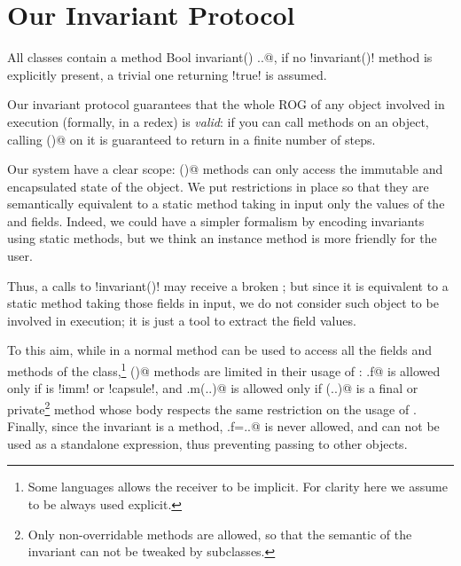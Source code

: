 \section{Our Invariant Protocol}
\label{s:protocol}
All classes contain a \Q@read method Bool invariant() {..}@, if no \Q!invariant()! method is explicitly present, a trivial one returning \Q!true! is assumed.

Our invariant protocol guarantees that the whole ROG of any object involved in execution (formally, in a redex) is \emph{valid}: if you can call methods on an object, calling \Q@invariant()@ on it is guaranteed to return \Q@true@ in a finite number of steps.

Our system have a clear scope:
\Q@invariant()@ methods can only access the immutable and encapsulated state of the object.
We put restrictions in place so that they are semantically equivalent to a static method
taking in input only the values of the \Q@imm@ and \Q@capsule@ fields.
Indeed, we could have a simpler formalism by encoding invariants using static methods, but we think an instance method is more friendly for the user.

Thus, a calls to \Q!invariant()! may receive a broken \Q@this@; but since it is equivalent to a static method taking those fields in input, we 
do not consider such \Q@this@ object to be involved in execution; it is just a tool to extract the field values.

To this aim, while in a normal method \Q@this@ can be used to access all the fields and methods of the class,\footnote{Some languages allows the \Q@this@ receiver to be implicit. For clarity here we assume \Q@this@ to be always used explicit.} \Q@invariant()@ methods are limited in their usage of \Q@this@:
\Q@this.f@ is allowed only if \Q@f@ is \Q!imm! or \Q!capsule!, and 
\Q@this.m(..)@ is allowed only if \Q@m(..)@ is a final or private\footnote{Only non-overridable methods are allowed, so that the semantic of the invariant can not be tweaked by subclasses.}
method whose body respects the same restriction on the usage of \Q@this@.
Finally, since the invariant is a \Q@read@ method,
\Q@this.f=..@ is never allowed, and \Q@this@ can not be used as a standalone expression, thus preventing passing \Q@this@ to other objects.

